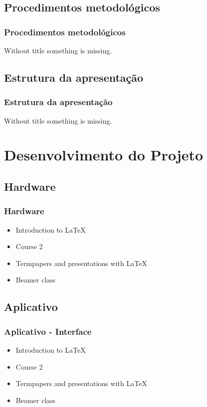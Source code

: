 \documentclass{beamer}
\begin{document}
        \subsection{Procedimentos metodológicos}

        \begin{frame}\frametitle{Procedimentos metodológicos}
        Without title something is missing.
        \end{frame}

        \subsection{Estrutura da apresentação}

        \begin{frame}\frametitle{Estrutura da apresentação}
        Without title something is missing.
        \end{frame}

    \section{Desenvolvimento do Projeto}

        \subsection{Hardware}

        \begin{frame}\frametitle{Hardware}
        \begin{itemize}
        \item Introduction to  \LaTeX
        \item Course 2
        \item Termpapers and presentations with \LaTeX
        \item Beamer class
        \end{itemize}
        \end{frame}

        \subsection{Aplicativo}

        \begin{frame}\frametitle{Aplicativo - Interface}
        \begin{itemize}
        \item Introduction to  \LaTeX \pause
        \item Course 2 \pause
        \item Termpapers and presentations with \LaTeX \pause
        \item Beamer class
        \end{itemize}
        \end{frame}
\end{document}
